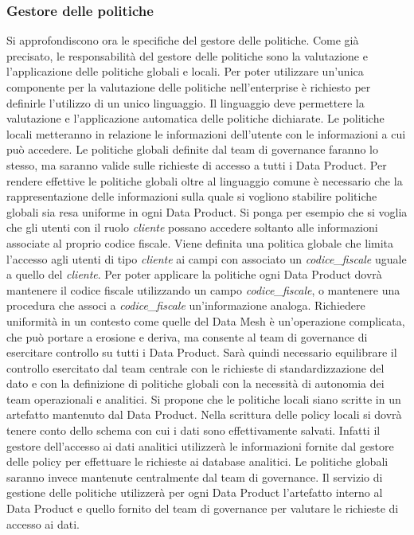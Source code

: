 \documentclass[12pt]{report}
\begin{document}
\subsubsection{Gestore delle politiche}
Si approfondiscono ora le specifiche del gestore delle politiche.
Come già precisato, le responsabilità del gestore delle politiche sono la valutazione e l'applicazione delle politiche globali e locali.
Per poter utilizzare un'unica componente per la valutazione delle politiche nell'enterprise è richiesto per definirle l'utilizzo di un unico linguaggio. 
Il linguaggio deve permettere la valutazione e l'applicazione automatica delle politiche dichiarate.
Le politiche locali metteranno in relazione le informazioni dell'utente con le informazioni a cui può accedere.
Le politiche globali definite dal team di governance faranno lo stesso, ma saranno valide sulle richieste di accesso a tutti i Data Product.
Per rendere effettive le politiche globali oltre al linguaggio comune è necessario che la rappresentazione delle informazioni sulla quale si vogliono stabilire politiche globali sia resa uniforme in ogni Data Product.
Si ponga per esempio che si voglia che gli utenti con il ruolo \textit{cliente} possano accedere soltanto alle informazioni associate al proprio codice fiscale.
Viene definita una politica globale che limita l'accesso agli utenti di tipo \textit{cliente} ai campi con associato un \textit{codice\_fiscale} uguale a quello del \textit{cliente}.
Per poter applicare la politiche ogni Data Product dovrà mantenere il codice fiscale utilizzando un campo \textit{codice\_fiscale}, o mantenere una procedura che associ  a \textit{codice\_fiscale} un'informazione analoga.
Richiedere uniformità in un contesto come quelle del Data Mesh è un'operazione complicata, che può portare a erosione e deriva, ma consente al team di governance di esercitare controllo su tutti i Data Product.
Sarà quindi necessario equilibrare il controllo esercitato dal team centrale con le richieste di standardizzazione del dato e con la definizione di politiche globali con la necessità di autonomia dei team operazionali e analitici.
Si propone che le politiche locali siano scritte in un artefatto mantenuto dal Data Product. 
Nella scrittura delle policy locali si dovrà tenere conto dello schema con cui i dati sono effettivamente salvati.
Infatti il gestore dell'accesso ai dati analitici utilizzerà le informazioni fornite dal gestore delle policy per effettuare le richieste ai database analitici.
Le politiche globali saranno invece mantenute centralmente dal team di governance.
Il servizio di gestione delle politiche utilizzerà per ogni Data Product l'artefatto interno al Data Product e quello fornito del team di governance per valutare le richieste di accesso ai dati.
\end{document}
